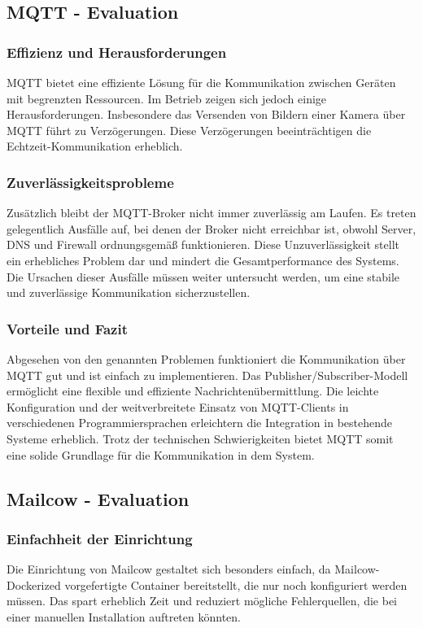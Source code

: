 \subsection{MQTT - Evaluation}

\subsubsection{Effizienz und Herausforderungen}
MQTT bietet eine effiziente Lösung für die Kommunikation zwischen Geräten mit begrenzten Ressourcen. Im Betrieb zeigen sich jedoch einige Herausforderungen. Insbesondere das Versenden von Bildern einer Kamera über MQTT führt zu Verzögerungen. Diese Verzögerungen beeinträchtigen die Echtzeit-Kommunikation erheblich.

\subsubsection{Zuverlässigkeitsprobleme}
Zusätzlich bleibt der MQTT-Broker nicht immer zuverlässig am Laufen. Es treten gelegentlich Ausfälle auf, bei denen der Broker nicht erreichbar ist, obwohl Server, DNS und Firewall ordnungsgemäß funktionieren. Diese Unzuverlässigkeit stellt ein erhebliches Problem dar und mindert die Gesamtperformance des Systems. Die Ursachen dieser Ausfälle müssen weiter untersucht werden, um eine stabile und zuverlässige Kommunikation sicherzustellen.

\subsubsection{Vorteile und Fazit}
Abgesehen von den genannten Problemen funktioniert die Kommunikation über MQTT gut und ist einfach zu implementieren. Das Publisher/Subscriber-Modell ermöglicht eine flexible und effiziente Nachrichtenübermittlung. Die leichte Konfiguration und der weitverbreitete Einsatz von MQTT-Clients in verschiedenen Programmiersprachen erleichtern die Integration in bestehende Systeme erheblich. Trotz der technischen Schwierigkeiten bietet MQTT somit eine solide Grundlage für die Kommunikation in dem System.

\subsection{Mailcow - Evaluation}

\subsubsection{Einfachheit der Einrichtung}
Die Einrichtung von Mailcow gestaltet sich besonders einfach, da Mailcow-Dockerized vorgefertigte Container bereitstellt, die nur noch konfiguriert werden müssen. Das spart erheblich Zeit und reduziert mögliche Fehlerquellen, die bei einer manuellen Installation auftreten könnten.

